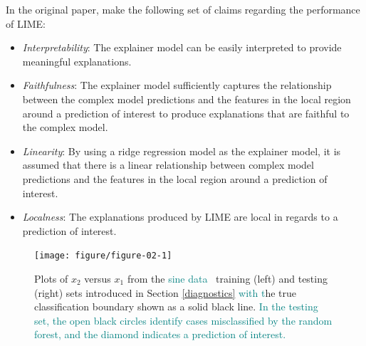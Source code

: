 \documentclass[AMS,STIX2COL]{WileyNJD-v2}\usepackage[]{graphicx}\usepackage[]{color}
\newenvironment{knitrout}{}{} %
\newcommand{\kge}[1]{\textcolor{teal}{#1}}
\newcommand{\data}{sine data}
\renewcommand{\sout}[1]{\unskip}
\begin{document}
In the original paper, \citet{ribeiro:2016} make the following set of claims regarding the performance of LIME:

\begin{itemize}
\item \emph{Interpretability}: The explainer model can be easily interpreted to provide meaningful explanations.
\item \emph{Faithfulness}: The explainer model sufficiently captures the relationship between the complex model predictions and the features in the local region around a prediction of interest to produce explanations that are faithful to the complex model.
\item \emph{Linearity}: By using a ridge regression model as the explainer model, it is assumed that there is a linear relationship between complex model predictions and the features in the local region around a prediction of interest.
\item \emph{Localness}: The explanations produced by LIME are local in regards to a prediction of interest.
\end{itemize}



\begin{figure}[!thp]
\centering
\begin{knitrout}
\color{fgcolor}

{\centering \texttt{[image: figure/figure-02-1]} 

}



\end{knitrout}
\caption{Plots of $x_2$ versus $x_1$ from the \kge{\data \ } training (left) and testing (right) sets\sout{ of the \data \ } introduced in Section \ref{diagnostics} \sout{. T} \kge{with t}he true classification boundary \sout{is} shown as a solid black line\sout{ in both plots}. \sout{The color of the training data represents the value of the observed response variable ($y$). The color of the testing data represents the random forest probability that an observation belongs to the category of blue.} \kge{In the testing set, the open black circles identify cases misclassified by the random forest, and the diamond indicates a prediction of interest.} \sout{The 18 cases that are misclassified by the random forest are identified by black circles.} \sout{The prediction of interest \kge{in the test data} \sout{to explain} is indicated by a diamond.}}
\label{fig:figure-02}
\end{figure}
\end{document}
